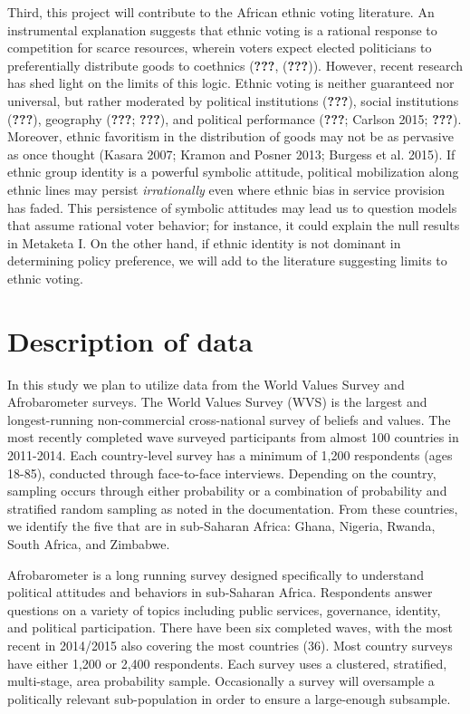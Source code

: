 \documentclass[]{article}
\begin{document}
Third, this project will contribute to the African ethnic voting
literature. An instrumental explanation suggests that ethnic voting is a
rational response to competition for scarce resources, wherein voters
expect elected politicians to preferentially distribute goods to
coethnics ({\textbf{???}}, ({\textbf{???}})). However, recent research
has shed light on the limits of this logic. Ethnic voting is neither
guaranteed nor universal, but rather moderated by political institutions
({\textbf{???}}), social institutions ({\textbf{???}}), geography
({\textbf{???}}; {\textbf{???}}), and political performance
({\textbf{???}}; Carlson 2015; {\textbf{???}}). Moreover, ethnic
favoritism in the distribution of goods may not be as pervasive as once
thought (Kasara 2007; Kramon and Posner 2013; Burgess et al. 2015). If
ethnic group identity is a powerful symbolic attitude, political
mobilization along ethnic lines may persist \emph{irrationally} even
where ethnic bias in service provision has faded. This persistence of
symbolic attitudes may lead us to question models that assume rational
voter behavior; for instance, it could explain the null results in
Metaketa I. On the other hand, if ethnic identity is not dominant in
determining policy preference, we will add to the literature suggesting
limits to ethnic voting.

\section{Description of data}\label{description-of-data}

In this study we plan to utilize data from the World Values Survey and
Afrobarometer surveys. The World Values Survey (WVS) is the largest and
longest-running non-commercial cross-national survey of beliefs and
values. The most recently completed wave surveyed participants from
almost 100 countries in 2011-2014. Each country-level survey has a
minimum of 1,200 respondents (ages 18-85), conducted through
face-to-face interviews. Depending on the country, sampling occurs
through either probability or a combination of probability and
stratified random sampling as noted in the documentation. From these
countries, we identify the five that are in sub-Saharan Africa: Ghana,
Nigeria, Rwanda, South Africa, and Zimbabwe.

Afrobarometer is a long running survey designed specifically to
understand political attitudes and behaviors in sub-Saharan Africa.
Respondents answer questions on a variety of topics including public
services, governance, identity, and political participation. There have
been six completed waves, with the most recent in 2014/2015 also
covering the most countries (36). Most country surveys have either 1,200
or 2,400 respondents. Each survey uses a clustered, stratified,
multi-stage, area probability sample. Occasionally a survey will
oversample a politically relevant sub-population in order to ensure a
large-enough subsample.
\end{document}
